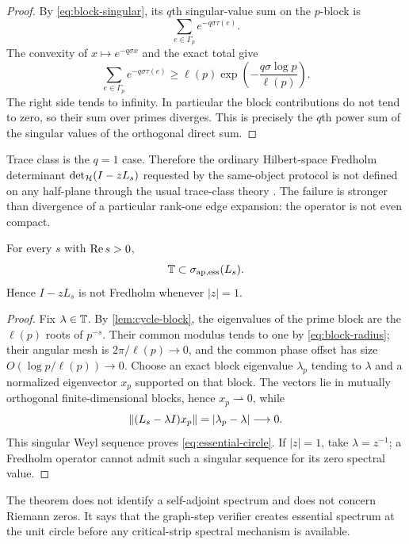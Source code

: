 \begin{proof}
By
\eqref{eq:block-singular}, its $q$th singular-value sum on the $p$-block is
\[
\sum_{e\in\Gamma_p}e^{-q\sigma\tau(e)}.
\]
The convexity of $x\mapsto e^{-q\sigma x}$ and the exact total give
\begin{equation}
\sum_{e\in\Gamma_p}e^{-q\sigma\tau(e)}
\ge \ell(p)\exp\!\left(-\frac{q\sigma\log p}{\ell(p)}\right).
\label{eq:jensen-schatten}
\end{equation}
The right side tends to infinity.  In particular the block contributions do
not tend to zero, so their sum over primes diverges.  This is precisely the
$q$th power sum of the singular values of the orthogonal direct sum.
\end{proof}

Trace class is the $q=1$ case.  Therefore the ordinary Hilbert-space Fredholm
determinant $\det_{\mathcal{H}}(I-zL_s)$ requested by the same-object protocol is
not defined on any half-plane through the usual trace-class theory
\citep{Simon1977}.  The failure is stronger than divergence of a particular
rank-one edge expansion: the operator is not even compact.

\begin{theorem}
\label{thm:essential-circle}
For every $s$ with $\operatorname{Re} s>0$,
\begin{equation}
\mathbb{T}\subset\sigma_{\mathrm{ap},\mathrm{ess}}(L_s).
\label{eq:essential-circle}
\end{equation}
Hence $I-zL_s$ is not Fredholm whenever $|z|=1$.
\end{theorem}

\begin{proof}
Fix $\lambda\in\mathbb{T}$.  By
\cref{lem:cycle-block}, the eigenvalues of the prime block are the
$\ell(p)$ roots of $p^{-s}$.  Their common modulus tends to one by
\eqref{eq:block-radius}; their angular mesh is $2\pi/\ell(p)\to0$, and the
common phase offset has size $O(\log p/\ell(p))\to0$.  Choose an exact
block eigenvalue $\lambda_p$ tending to $\lambda$ and a normalized
eigenvector $x_p$ supported on that block.  The vectors lie in mutually
orthogonal finite-dimensional blocks, hence $x_p\rightharpoonup0$, while
\[
\left\lVert(L_s-\lambda I)x_p\right\rVert=|\lambda_p-\lambda|\longrightarrow0.
\]
This singular Weyl sequence proves
\eqref{eq:essential-circle}.  If $|z|=1$, take $\lambda=z^{-1}$; a Fredholm
operator cannot admit such a singular sequence for its zero spectral value.
\end{proof}

The theorem does not identify a self-adjoint spectrum and does not concern
Riemann zeros.  It says that the graph-step verifier creates essential
spectrum at the unit circle before any critical-strip spectral mechanism is
available.

